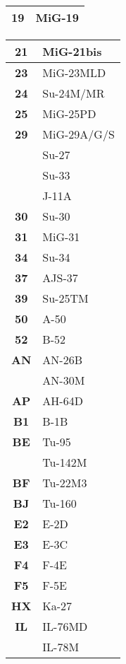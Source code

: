 \documentclass[8pt,usenames,dvipsnames,twoside]{article}
\begin{document}
\begin{multicols*}{2}
\begin{center}
\begin{tabular}{c | p{4cm} }
				\midrule
				\textbf{19} & MiG-19 \\
				\midrule
			\end{tabular}
		\end{center}
		\begin{center}
			\begin{tabular}{c | p{4cm}}
				\textbf{21} & MiG-21bis \\
				\midrule
				\textbf{23} & MiG-23MLD \\
				\midrule
				\textbf{24} & Su-24M/MR \\
				\midrule
				\textbf{25} & MiG-25PD \\
				\midrule
				\textbf{29} & MiG-29A/G/S \\
				& Su-27 \\
				& Su-33 \\
				& J-11A \\
				\midrule
				\textbf{30} & Su-30 \\
				\midrule
				\textbf{31} & MiG-31 \\
				\midrule
				\textbf{34} & Su-34 \\
				\midrule
				\textbf{37} & AJS-37 \\
				\midrule
				\textbf{39} & Su-25TM \\
				\midrule
				\textbf{50} & A-50 \\
				\midrule
				\textbf{52} & B-52 \\
				\midrule
				\textbf{AN} & AN-26B \\
				& AN-30M \\
				\midrule
				\textbf{AP} & AH-64D \\
				\midrule
				\textbf{B1} & B-1B \\
				\midrule
				\textbf{BE} & Tu-95 \\
				& Tu-142M \\
				\midrule
				\textbf{BF} & Tu-22M3 \\
				\midrule
				\textbf{BJ} & Tu-160 \\
				\midrule
				\textbf{E2} & E-2D \\
				\midrule
				\textbf{E3} & E-3C \\
				\midrule
				\textbf{F4} & F-4E \\
				\midrule
				\textbf{F5} & F-5E \\
				\midrule
				\textbf{HX} & Ka-27 \\
				\midrule
				\textbf{IL} & IL-76MD \\
				& IL-78M \\

\end{tabular}
\end{center}
\end{multicols*}
\end{document}
